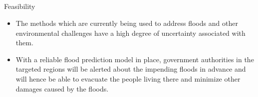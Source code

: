 \documentclass[10pt]{beamer}
\begin{document}
\subsection{}
\begin{frame}{Feasibility}
    \begin{block}{}
        \begin{itemize}
            \item The methods which are currently being used to address floods and other environmental challenges have a high degree of uncertainty associated with them.
            \item With a reliable flood prediction model in place, government authorities in the targeted regions will be alerted about the impending floods in advance and will hence be able to evacuate the people living there and minimize other damages caused by the floods.
         \end{itemize}
    \end{block}
\end{frame}


{\1
\begin{frame}
\end{frame}}
\end{document}
